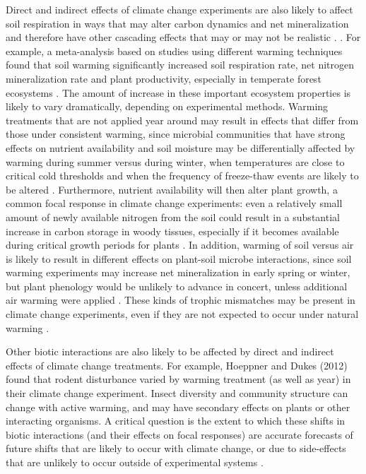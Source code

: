 \documentclass{article}
\begin{document}
\par Direct and indirect effects of climate change experiments are also likely to affect soil respiration in ways that may alter carbon dynamics and net mineralization and therefore have other cascading effects that may or may not be realistic \citep{deltoro2015}. . For example, a meta-analysis based on studies using different warming techniques found that soil warming significantly increased soil respiration rate, net nitrogen mineralization rate and plant productivity, especially in temperate forest ecosystems \citep {rustad2001}. The amount of increase in these important ecosystem properties is likely to vary dramatically, depending on experimental methods. Warming treatments that are not applied year around \citep[e.g.][]{clark2014a,clark2014b} may result in effects that differ from those under consistent warming, since microbial communities that have strong effects on nutrient availability and soil moisture may be differentially affected by warming during summer versus during winter, when temperatures are close to critical cold thresholds and when the frequency of freeze-thaw events are likely to be altered \citep{rivkina2000,mcdaniel2014}. Furthermore, nutrient availability will then alter plant growth, a common focal response in climate change experiments: even a relatively small amount of newly available nitrogen from the soil could result in a substantial increase in carbon storage in woody tissues, especially if it becomes available during critical growth periods for plants \citep{duran2014, millard2010}. In addition, warming of soil versus air is likely to result in different effects on plant-soil microbe interactions, since soil warming experiments may increase net mineralization in early spring or winter, but plant phenology would be unlikely to advance in concert, unless additional air warming were applied \citep{du2014}.
These kinds of trophic mismatches may be present in climate change experiments, even if they are not expected to occur under natural warming \citep{kharouba2015}. 
\par Other biotic interactions are also likely to be affected by direct and indirect effects of climate change treatments. For example, Hoeppner and Dukes (2012) found that rodent disturbance varied by warming treatment (as well as year) in their climate change experiment. Insect diversity and community structure can change with active warming, and may have secondary effects on plants or other interacting organisms\citep{pelini2014,diamond2016}. A critical question is the extent to which these shifts in biotic interactions (and their effects on focal responses) are accurate forecasts of future shifts that are likely to occur with climate change, or due to side-effects that are unlikely to occur outside of experimental systems \citep{diamond2013}.
\end{document}
